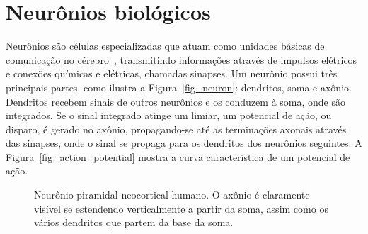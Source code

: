\section{Neurônios biológicos}\label{sec_neurônios}

Neurônios são células especializadas que atuam como unidades básicas de comunicação no cérebro~\cite{Neuronal2019}, transmitindo
informações através de impulsos elétricos e conexões químicas e elétricas, chamadas sinapses. Um neurônio possui três principais
partes, como ilustra a Figura~\ref{fig_neuron}: dendritos, soma e axônio. Dendritos recebem sinais de outros neurônios e os
conduzem à soma, onde são integrados. Se o sinal integrado atinge um limiar, um potencial de ação, ou disparo, é gerado no axônio,
propagando-se até as terminações axonais através das sinapses, onde o sinal se propaga para os dendritos dos neurônios seguintes.
A Figura~\ref{fig_action_potential} mostra a curva característica de um potencial de ação.

\begin{figure}[!ht]
\caption{Neurônio piramidal neocortical humano. O axônio é claramente visível se estendendo verticalmente a partir da soma, assim
como os vários dendritos que partem da base da soma.}
\end{figure}

